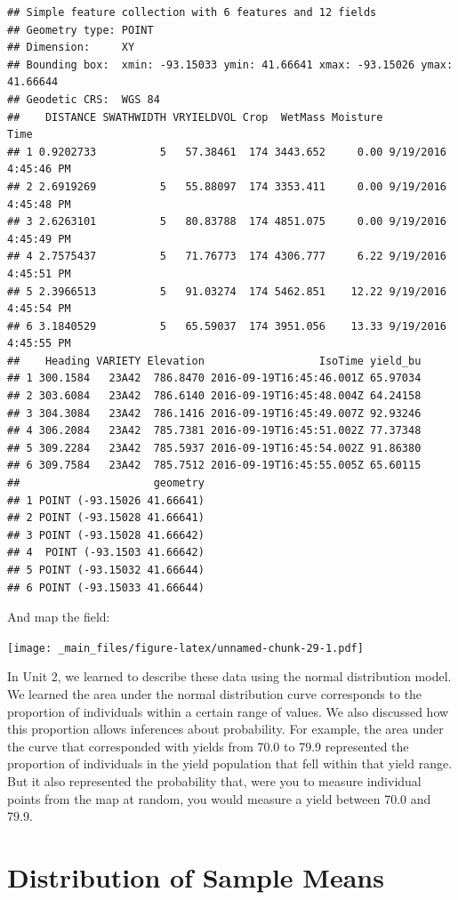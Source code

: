 \documentclass[
]{book}
\begin{document}
\begin{verbatim}
## Simple feature collection with 6 features and 12 fields
## Geometry type: POINT
## Dimension:     XY
## Bounding box:  xmin: -93.15033 ymin: 41.66641 xmax: -93.15026 ymax: 41.66644
## Geodetic CRS:  WGS 84
##    DISTANCE SWATHWIDTH VRYIELDVOL Crop  WetMass Moisture                 Time
## 1 0.9202733          5   57.38461  174 3443.652     0.00 9/19/2016 4:45:46 PM
## 2 2.6919269          5   55.88097  174 3353.411     0.00 9/19/2016 4:45:48 PM
## 3 2.6263101          5   80.83788  174 4851.075     0.00 9/19/2016 4:45:49 PM
## 4 2.7575437          5   71.76773  174 4306.777     6.22 9/19/2016 4:45:51 PM
## 5 2.3966513          5   91.03274  174 5462.851    12.22 9/19/2016 4:45:54 PM
## 6 3.1840529          5   65.59037  174 3951.056    13.33 9/19/2016 4:45:55 PM
##    Heading VARIETY Elevation                  IsoTime yield_bu
## 1 300.1584   23A42  786.8470 2016-09-19T16:45:46.001Z 65.97034
## 2 303.6084   23A42  786.6140 2016-09-19T16:45:48.004Z 64.24158
## 3 304.3084   23A42  786.1416 2016-09-19T16:45:49.007Z 92.93246
## 4 306.2084   23A42  785.7381 2016-09-19T16:45:51.002Z 77.37348
## 5 309.2284   23A42  785.5937 2016-09-19T16:45:54.002Z 91.86380
## 6 309.7584   23A42  785.7512 2016-09-19T16:45:55.005Z 65.60115
##                     geometry
## 1 POINT (-93.15026 41.66641)
## 2 POINT (-93.15028 41.66641)
## 3 POINT (-93.15028 41.66642)
## 4  POINT (-93.1503 41.66642)
## 5 POINT (-93.15032 41.66644)
## 6 POINT (-93.15033 41.66644)
\end{verbatim}

And map the field:

\texttt{[image: \_main\_files/figure-latex/unnamed-chunk-29-1.pdf]}

In Unit 2, we learned to describe these data using the normal
distribution model. We learned the area under the normal distribution
curve corresponds to the proportion of individuals within a certain
range of values. We also discussed how this proportion allows inferences
about probability. For example, the area under the curve that
corresponded with yields from 70.0 to 79.9 represented the proportion of
individuals in the yield population that fell within that yield range.
But it also represented the probability that, were you to measure
individual points from the map at random, you would measure a yield
between 70.0 and 79.9.

\hypertarget{distribution-of-sample-means}{%
\section{Distribution of Sample Means}\label{distribution-of-sample-means}}
\end{document}
